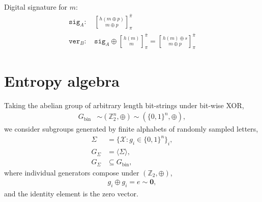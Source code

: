\documentclass[twocolumn, aps, amsmath, amssymb, nofootinbib, superscriptaddress, longbibliography, doublefloatfix, table-of-contents, eqsecnum, rmp]{revtex4-2}
\def\zerovec{\mathbf{0}}
\newcommand{\stackbraid}[2]{{\genfrac{[}{]}{0pt}{}{{#1}}{{#2}}}^{\bar{\pi}}_{\pi}}
\begin{document}
Digital signature for $m$:
\begin{align}
	\mathtt{sig}_A:\, &\stackbraid{h(m\oplus p)}{m\oplus p}\nonumber\\
	\mathtt{ver}_B:\, &\mathtt{sig}_A \oplus \stackbraid{h(m)}{m} = \stackbraid{h(m) \oplus s}{m\oplus p} %
\end{align}


%

\section{Entropy algebra}

Taking the abelian group of arbitrary length bit-strings under bit-wise XOR,
\begin{align}
	G_\mathrm{bin} &\sim (\mathbb{Z}_2^n,\oplus) \sim  (\{0,1\}^n,\oplus),
\end{align}
we consider subgroups generated by finite alphabets of randomly sampled letters,
\begin{align}
	\Sigma &= \{\mathcal{X}: g_i \in \{0,1\}^n\}_i,\nonumber\\
	G_\Sigma &= \langle \Sigma \rangle, \nonumber\\
	G_\Sigma &\subseteq G_\mathrm{bin},
\end{align}
where individual generators compose under $(\mathbb{Z}_2,\oplus)$,
\begin{align}
	g_i\oplus g_i = e \sim \zerovec,
\end{align}
and the identity element is the zero vector.
\end{document}
